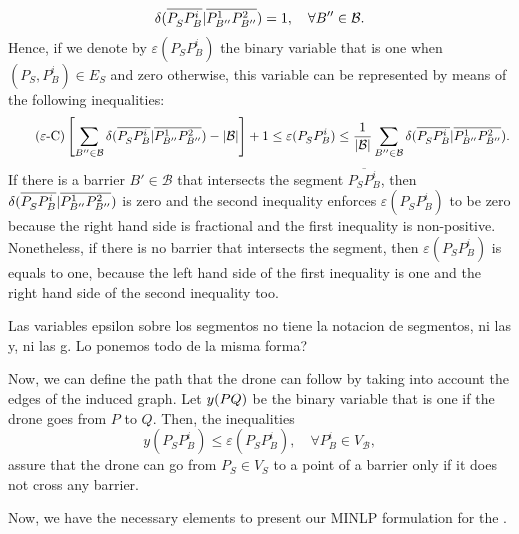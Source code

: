 \documentclass[a4paper]{elsarticle}
\newcommand{\SPPN}{{\sf{H-SPPN}\xspace }}
\newcommand{\B}{{\mathcal B}}
\newcommand{\VB}{{V^{}_{\mathcal B}}}
\newcommand{\VS}{{V^{}_{S}}}
\newcommand{\ES}{{E^{}_{S}}}
\newcommand{\CV}[1]{{\color{atomictangerine}#1}}
\begin{document}
\newcommand{\varepsilonvar}[2]{\varepsilon(#1#2)}
$$\deltacheck{P^{}_S}{P_B^i}{P^1_{B''}}{P^2_{B''}}=1,\quad\forall B''\in\B.$$
Hence, if we denote by $\varepsilonvar{P^{}_S}{P_B^i}$ the binary variable that is one when $(P^{}_S,P_B^i)\in\ES$ and zero otherwise, this variable can be represented by means of the following inequalities:
\begin{equation*}\tag{$\varepsilon$-C}\label{eq:varepsilonC}
\left[\sum_{B''\in\mathcal B}\deltacheck{P^{}_S}{P_B^i}{P^1_{B''}}{P^2_{B''}}-|\mathcal B|\right] + 1\leq \varepsilonvar{P^{}_S}{P_B^i}\leq \frac{1}{|\B|}\sum_{B''\in\mathcal B}\deltacheck{P^{}_S}{P_B^i}{P^1_{B''}}{P^2_{B''}}.
\end{equation*}
If there is a barrier $B'\in\B$ that intersects the segment $\overline{P^{}_SP_B^i}$, then $\delta(\overline{P^{}_SP_B^i}|\overline{P^1_{B''}P^2_{B''}})$ is zero and the second inequality enforces $\varepsilonvar{P^{}_S}{P_B^i}$ to be zero because the right hand side is fractional and the first inequality is non-positive. Nonetheless, if there is no barrier that intersects the segment, then $\varepsilonvar{P^{}_S}{P_B^i}$ is equals to one, because the left hand side of the first inequality is one and the right hand side of the second inequality too.

\CV{Las variables epsilon sobre los segmentos no tiene la notacion de segmentos, ni las y, ni las g. Lo ponemos todo de la misma forma?}

\newcommand{\yvar}[2]{y(#1#2)}

Now, we can define the path that the drone can follow by taking into account the edges of the induced graph. Let $\yvar{PQ}$ be the binary variable that is one if the drone goes from $P$ to $Q$. Then, the inequalities
\begin{equation*}\tag{y-C}\label{eq:yC}
\yvar{P^{}_S}{P_B^i}\leq \varepsilonvar{P^{}_S}{P_B^i},\quad\forall P_B^i\in \VB,
\end{equation*}
assure that the drone can go from $P_S^{}\in \VS$ to a point of a barrier only if it does not cross any barrier. 


Now, we have the necessary elements to present our MINLP formulation for the \SPPN.
\end{document}
